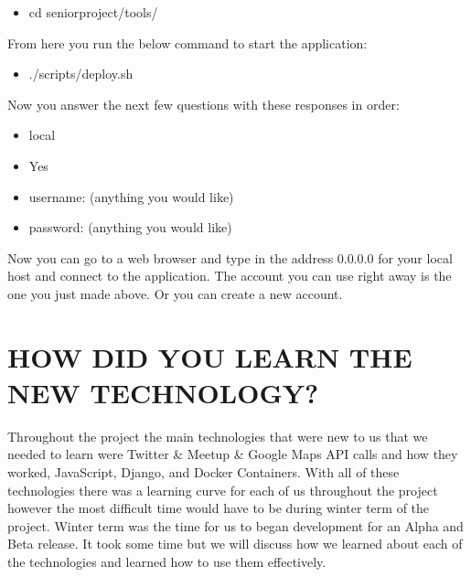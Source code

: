 \documentclass[draftclsnofoot,10pt,onecolumn]{IEEEtran} %
\begin{document}
\begin{enumerate}
	\begin{itemize}
		\item cd seniorproject/tools/ \\
	\end{itemize}
	
	From here you run the below command to start the application:
	
	\begin{itemize}
		\item ./scripts/deploy.sh \\
	\end{itemize}
	
	Now you answer the next few questions with these responses in order:
	
	\begin{itemize}
		\item local
		\item Yes
		\item username: (anything you would like)
		\item password: (anything you would like) \\
	\end{itemize}
	
	Now you can go to a web browser and type in the address 0.0.0.0 for your local host and connect to the application. 
	The account you can use right away is the one you just made above. Or you can create a new account. \\
	
	
\end{enumerate}

\section{HOW DID YOU LEARN THE NEW TECHNOLOGY?}

Throughout the project the main technologies that were new to us that we needed to learn were Twitter \& Meetup \& Google Maps API
calls and how they worked, JavaScript, Django, and Docker Containers. With all of these technologies there was a learning curve 
for each of us throughout the project however the most difficult time would have to be during winter term of the project. Winter 
term was the time for us to began development for an Alpha and Beta release. It took some time but we will discuss how we 
learned about each of the technologies and learned how to use them effectively. \\
\end{document}
